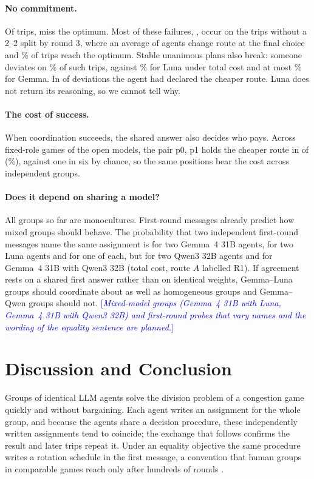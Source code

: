 \documentclass[11pt]{article}
\newcommand{\pending}[1]{\textcolor{blue}{[\textit{#1}]}}
\begin{document}
\paragraph{No commitment.}
Of \LunaFairTrips{} trips, \LunaFairFailed{} miss the optimum. Most of these failures, \LunaFairNoPlanFailed, occur on the \LunaFairNoPlan{} trips without a 2--2 split by round 3, where an average of \LunaFairNoPlanDev{} agents change route at the final choice and \LunaFairNoPlanSO\% of trips reach the optimum. Stable unanimous plans also break: someone deviates on \DefectLunaFair\% of \DefectLunaFairTrips{} such trips, against \DefectLunaSoc\% for Luna under total cost and at most \DefectGemmaMax\% for Gemma. In \DefectLunaFromCheap{} of \DefectLunaDev{} deviations the agent had declared the cheaper route. Luna does not return its reasoning, so we cannot tell why.

\paragraph{The cost of success.}
When coordination succeeds, the shared answer also decides who pays. Across fixed-role games of the open models, the pair p0, p1 holds the cheaper route in \FixedPairFront{} of \FixedPairGames{} (\FixedPairFrontPct\%), against one in six by chance, so the same positions bear the cost across independent groups.

\paragraph{Does it depend on sharing a model?}
All groups so far are monocultures. First-round messages already predict how mixed groups should behave. The probability that two independent first-round messages name the same assignment is \CoGG{} for two Gemma~4 31B agents, \CoLL{} for two Luna agents and \CoGL{} for one of each, but \CoQQ{} for two Qwen3 32B agents and \CoGQ{} for Gemma~4 31B with Qwen3 32B (total cost, route $A$ labelled R1). If agreement rests on a shared first answer rather than on identical weights, Gemma--Luna groups should coordinate about as well as homogeneous groups and Gemma--Qwen groups should not. \pending{Mixed-model groups (Gemma~4 31B with Luna, Gemma~4 31B with Qwen3 32B) and first-round probes that vary names and the wording of the equality sentence are planned.}

\section{Discussion and Conclusion}
\label{sec:discussion}
Groups of identical LLM agents solve the division problem of a congestion game quickly and without bargaining. Each agent writes an assignment for the whole group, and because the agents share a decision procedure, these independently written assignments tend to coincide; the exchange that follows confirms the result and later trips repeat it. Under an equality objective the same procedure writes a rotation schedule in the first message, a convention that human groups in comparable games reach only after hundreds of rounds \citep{helbing2005_turn_taking}.
\end{document}
